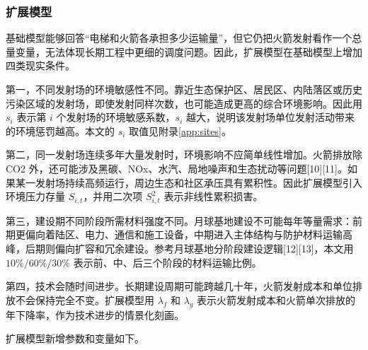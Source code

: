 \documentclass[12pt,a4paper,UTF8]{article}
\begin{document}
\subsubsection{扩展模型}

基础模型能够回答“电梯和火箭各承担多少运输量”，但它仍把火箭发射看作一个总量变量，无法体现长期工程中更细的调度问题。因此，扩展模型在基础模型上增加四类现实条件。

第一，不同发射场的环境敏感性不同。靠近生态保护区、居民区、内陆落区或历史污染区域的发射场，即使发射同样次数，也可能造成更高的综合环境影响。因此用 \(s_i\) 表示第 \(i\) 个发射场的环境敏感系数，\(s_i\) 越大，说明该发射场单位发射活动带来的环境惩罚越高。本文的 \(s_i\) 取值见附录\ref{app:sites}。

第二，同一发射场连续多年大量发射时，环境影响不应简单线性增加。火箭排放除 CO2 外，还可能涉及黑碳、NOx、水汽、局地噪声和生态扰动等问题[10][11]。如果某一发射场持续高频运行，周边生态和社区承压具有累积性。因此扩展模型引入环境压力存量 \(S_{i,t}\)，并用二次项 \(S_{i,t}^2\) 表示非线性累积损害。

第三，建设期不同阶段所需材料强度不同。月球基地建设不可能每年等量需求：前期更偏向着陆区、电力、通信和施工设备，中期进入主体结构与防护材料运输高峰，后期则偏向扩容和冗余建设。参考月球基地分阶段建设逻辑[12][13]，本文用 \(10\%/60\%/30\%\) 表示前、中、后三个阶段的材料运输比例。

第四，技术会随时间进步。长期建设周期可能跨越几十年，火箭发射成本和单位排放不会保持完全不变。扩展模型用 \(\lambda_f\) 和 \(\lambda_g\) 表示火箭发射成本和火箭单次排放的年下降率，作为技术进步的情景化刻画。

扩展模型新增参数和变量如下。
\end{document}

